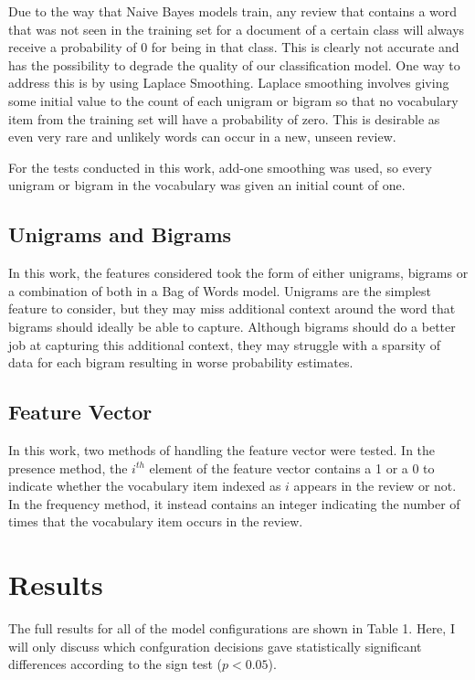 \documentclass[twocolumn]{article}
\begin{document}
Due to the way that Naive Bayes models train, any review that contains a word that was not seen in the training set for a document of a certain class will always receive a probability of 0 for being in that class. This is clearly not accurate and has the possibility to degrade the quality of our classification model. One way to address this is by using Laplace Smoothing. Laplace smoothing involves giving some initial value to the count of each unigram or bigram so that no vocabulary item from the training set will have a probability of zero. This is desirable as even very rare and unlikely words can occur in a new, unseen review.

For the tests conducted in this work, add-one smoothing was used, so every unigram or bigram in the vocabulary was given an initial count of one.

\subsection{Unigrams and Bigrams}

In this work, the features considered took the form of either unigrams, bigrams or a combination of both in a Bag of Words model. Unigrams are the simplest feature to consider, but they may miss additional context around the word that bigrams should ideally be able to capture. Although bigrams should do a better job at capturing this additional context, they may struggle with a sparsity of data for each bigram resulting in worse probability estimates.

\subsection{Feature Vector}

In this work, two methods of handling the feature vector were tested. In the presence method, the $i^{th}$ element of the feature vector contains a 1 or a 0 to indicate whether the vocabulary item indexed as $i$ appears in the review or not. In the frequency method, it instead contains an integer indicating the number of times that the vocabulary item occurs in the review.

\section{Results}

The full results for all of the model configurations are shown in Table 1. Here, I will only discuss which confguration decisions gave statistically significant differences according to the sign test ($p < 0.05$).
\end{document}
